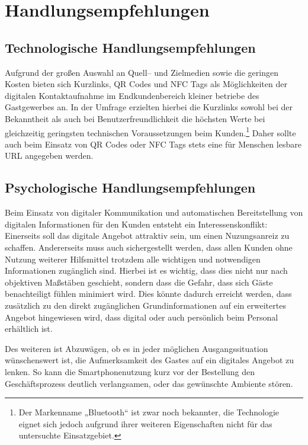 


\newpage
\section{Handlungsempfehlungen} %
\label{sec:handlungsempfehlungen}

\subsection{Technologische Handlungsempfehlungen} %
\label{sub:technologische_handlungsempfehlungen}
Aufgrund der großen Auswahl an Quell– und Zielmedien sowie die geringen Kosten bieten sich Kurzlinks, QR Codes und NFC Tags als Möglichkeiten der digitalen Kontaktaufnahme im Endkundenbereich kleiner betriebe des Gastgewerbes an. In der Umfrage erzielten hierbei die Kurzlinks sowohl bei der Bekanntheit als auch bei Benutzerfreundlichkeit die höchsten Werte bei gleichzeitig geringsten technischen Voraussetzungen beim Kunden.\footnote{Der Markenname „Bluetooth“ ist zwar noch bekannter, die Technologie eignet sich jedoch aufgrund ihrer weiteren Eigenschaften nicht für das untersuchte Einsatzgebiet.} Daher sollte auch beim Einsatz von QR Codes oder NFC Tags stets eine für Menschen lesbare \ac{URL} angegeben werden.





\subsection{Psychologische Handlungsempfehlungen} %
\label{sub:psychologische_handlungsempfehlungen}
Beim Einsatz von digitaler Kommunikation und automatischen Bereitstellung von digitalen Informationen für den Kunden entsteht ein Interessenskonflikt: Einerseits soll das digitale Angebot attraktiv sein, um einen Nuzungsanreiz zu schaffen. Andererseits muss auch sichergestellt werden, dass allen Kunden ohne Nutzung weiterer Hilfsmittel trotzdem alle wichtigen und notwendigen Informationen zugänglich sind.
Hierbei ist es wichtig, dass dies nicht nur nach objektiven Maßstäben geschieht, sondern dass die Gefahr, dass sich Gäste benachteiligt fühlen minimiert wird. Dies könnte dadurch erreicht werden, dass zusätzlich zu den direkt zugänglichen Grundinformationen auf ein erweitertes Angebot hingewiesen wird, dass digital oder auch persönlich beim Personal erhältlich ist.

Des weiteren ist Abzuwägen, ob es in jeder möglichen Ausgangssituation wünschenswert ist, die Aufmerksamkeit des Gastes auf ein digitales Angebot zu lenken. So kann die Smartphonenutzung kurz vor der Bestellung den Geschäftsprozess deutlich verlangsamen, oder das gewünschte Ambiente stören. 


